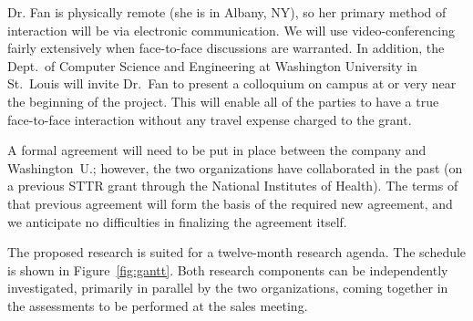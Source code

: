 Dr. Fan is physically remote (she is in Albany, NY), so her primary
method of interaction will be via electronic communication.  We will
use video-conferencing fairly extensively when face-to-face discussions
are warranted.  In addition, the Dept.~of Computer Science and Engineering
at Washington University in St.~Louis
will invite Dr.~Fan to present a colloquium on campus at or very near
the beginning of the project.  This will enable all of the parties to
have a true face-to-face interaction without any travel expense charged
to the grant.

A formal agreement will need to be put in place between the company and
Washington~U.; however, the two organizations have collaborated in the
past (on a previous STTR grant through the National Institutes of Health).
The terms of that previous agreement will form the
basis of the required new agreement, and we anticipate no difficulties
in finalizing the agreement itself.


The proposed research is suited for a twelve-month research agenda.
The schedule is shown in Figure~\ref{fig:gantt}.
Both research components can be independently investigated,
primarily in parallel by the two organizations, coming together
in the assessments to be performed at the sales meeting.

